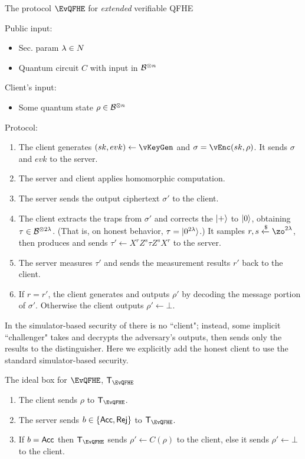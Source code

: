 \begin{protocol}{The protocol $\EvQFHE$ for \emph{extended} verifiable QFHE}

	Public input:
	\begin{itemize}
		\item Sec. param $\lambda\in\relax{N}$
		\item Quantum circuit $C$ with input in $\mathcal{B}^{\otimes n}$
	\end{itemize}

	Client's input:
	\begin{itemize}
		\item Some quantum state $\rho\in\mathcal{B}^{\otimes n}$
	\end{itemize}

	Protocol:
	\begin{enumerate}
		\item The client generates $(sk, evk)\leftarrow\vKeyGen$ and $\sigma=\vEnc(sk, \rho)$. It sends $\sigma$ and $evk$ to the server.
		\item The server and client applies homomorphic computation. 
		\item The server sends the output ciphertext $\sigma'$ to the client.
		\item The client extracts the traps from $\sigma'$ and corrects the $\ket{+}$ to $\ket{0}$, obtaining $\tau\in\mathcal{B}^{\otimes 2\lambda}$. (That is, on honest behavior, $\tau=\ket{0^{2\lambda}}$.)
			It samples $r, s\xleftarrow{\$}\zo^{2\lambda}$, then produces and sends $\tau'\leftarrow X^rZ^s\tau Z^sX^r$ to the server.
		\item The server measures $\tau'$ and sends the measurement results $r'$ back to the client.
		\item If $r=r'$, the client generates and outputs $\rho'$ by decoding the message portion of $\sigma'$. Otherwise the client outputs $\rho'\leftarrow\bot$.
	\end{enumerate}

\end{protocol}

In the simulator-based security of \cite{magic_circuits} there is no ``client";
instead, some implicit ``challenger" takes and decrypts the adversary's outputs, then sends only the results to the distinguisher.
Here we explicitly add the honest client to use the standard simulator-based security.

\begin{protocol}{The ideal box for $\EvQFHE$, $\trustp_\EvQFHE$}

	\begin{enumerate}
		\item The client sends $\rho$ to $\trustp_\EvQFHE$.
		\item The server sends $b\in\left\{{\mathsf{Acc}}, {\mathsf{Rej}}\right\}$ to $\trustp_\EvQFHE$.
		\item If $b={\mathsf{Acc}}$ then $\trustp_\EvQFHE$ sends $\rho'\leftarrow C(\rho)$ to the client, else it sends $\rho'\leftarrow\bot$ to the client.
	\end{enumerate}

\end{protocol}

